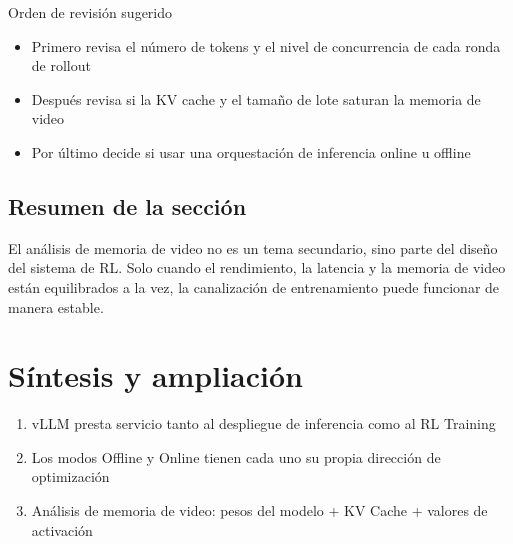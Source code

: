\documentclass[a4paper]{article}
\begin{document}
\begin{knowledgebox}{Orden de revisión sugerido}
\begin{itemize}
  \item Primero revisa el número de tokens y el nivel de concurrencia de cada ronda de rollout
  \item Después revisa si la KV cache y el tamaño de lote saturan la memoria de video
  \item Por último decide si usar una orquestación de inferencia online u offline
\end{itemize}
\end{knowledgebox}

\subsection{Resumen de la sección}
El análisis de memoria de video no es un tema secundario, sino parte del diseño del sistema de RL. Solo cuando el rendimiento, la latencia y la memoria de video están equilibrados a la vez, la canalización de entrenamiento puede funcionar de manera estable.

\newpage
\section{Síntesis y ampliación}
\begin{enumerate}
  \item vLLM presta servicio tanto al despliegue de inferencia como al RL Training
  \item Los modos Offline y Online tienen cada uno su propia dirección de optimización
  \item Análisis de memoria de video: pesos del modelo + KV Cache + valores de activación
\end{enumerate}
\end{document}
